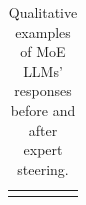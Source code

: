 \begin{table}[t]
\begin{tabular}{p{0.08cm}p{0.2cm}p{2.5cm}p{4.5cm}@{\ \ \ \ }p{5.2cm}}
\\
\addlinespace[0.1em]
\bottomrule
\end{tabular}

\caption{
Qualitative examples of MoE LLMs' responses before and after expert steering.
}

\label{tab:examples}
\end{table}